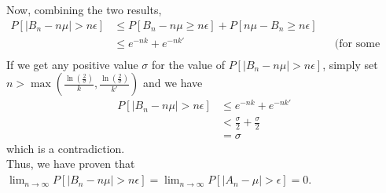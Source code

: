 Now, combining the two results,
\begin{align*}
    P[\lvert B_n - n\mu\rvert > n\epsilon] &\le P[B_n - n\mu \ge n\epsilon] + P[n\mu - B_n \ge n\epsilon]\\
    &\le e^{-nk} + e^{-nk'} && \text{(for some positive coefficients k and k')}\\
\end{align*}
If we get any positive value $\sigma$ for the value of $P[\lvert B_n - n\mu\rvert > n\epsilon]$, simply set $n > \max(\frac{\ln(\frac{2}{\sigma})}{k}, \frac{\ln(\frac{2}{\sigma})}{k'})$ and we have
\begin{align*}
    P[\lvert B_n - n\mu\rvert > n\epsilon] &\le e^{-nk} + e^{-nk'}\\
    &< \frac{\sigma}{2} + \frac{\sigma}{2}\\
    &= \sigma
\end{align*}
which is a contradiction.\\
Thus, we have proven that $\lim_{n\to \infty}P[\lvert B_n - n\mu\rvert > n\epsilon]=\lim_{n\to \infty}P[\lvert A_n - \mu\rvert > \epsilon]=0$.\\